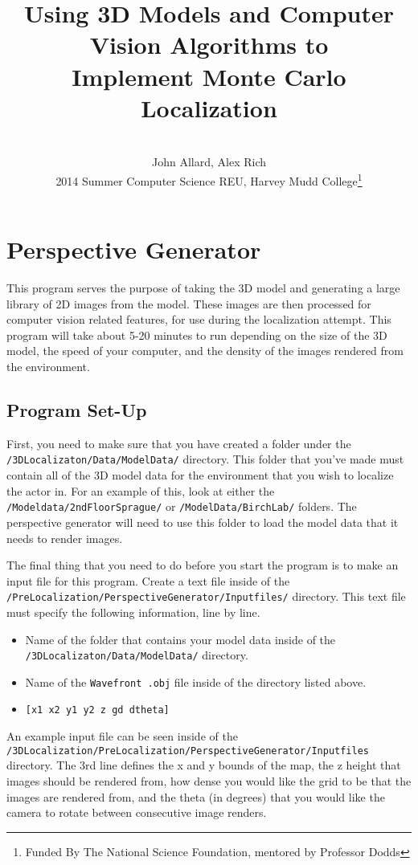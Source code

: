 \documentclass[a4paper,11pt]{article}
\title{Using 3D Models and Computer Vision Algorithms to \\ Implement Monte Carlo Localization}
\author{ \\[7in]  John Allard, Alex Rich \\ 2014 Summer Computer Science REU, Harvey Mudd College\thanks{Funded By The National Science Foundation, mentored by Professor Dodds}}
\begin{document}
\section{Perspective Generator}
 This program serves the purpose of taking the 3D model and generating a large library of 2D images from the model. These images are then processed for computer vision related features, for use during the localization attempt. This program will take about 5-20 minutes to run depending on the size of the 3D model, the speed of your computer, and the density of the images rendered from the environment.
 \subsection{Program Set-Up}
 First, you need to make sure that you have created a folder under the \texttt{/3DLocalizaton/Data/ModelData/} directory. This folder that you've made must contain all of the 3D model data for the environment that you wish to localize the actor in. For an example of this, look at either the \texttt{/Modeldata/2ndFloorSprague/} or \texttt{/ModelData/BirchLab/} folders. The perspective generator will need to use this folder to load the model data that it needs to render images. 

 The final thing that you need to do before you start the program is to make an input file for this program. Create a text file inside of the \texttt{/PreLocalization/PerspectiveGenerator/Inputfiles/} directory. This text file must specify the following information, line by line.

 \begin{itemize}
 \item Name of the folder that contains your model data inside of the  \texttt{/3DLocalizaton/Data/ModelData/} directory.
 \item Name of the \texttt{Wavefront .obj} file inside of the directory listed above.
 \item \texttt{[x1 x2 y1 y2 z gd dtheta]}
 \end{itemize}

 An example input file can be seen inside of the \texttt{/3DLocalization/PreLocalization/PerspectiveGenerator/Inputfiles} directory. The 3rd line defines the x and y bounds of the map, the z height that images should be rendered from, how dense you would like the grid to be that the images are rendered from, and the theta (in degrees) that you would like the camera to rotate between consecutive image renders.
\end{document}
